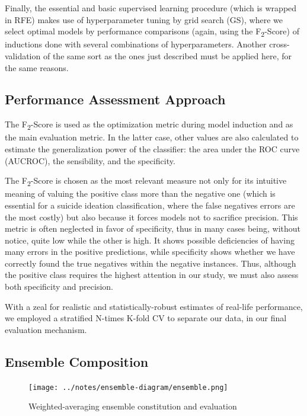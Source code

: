 Finally, the essential and basic supervised learning procedure (which is wrapped in RFE) makes use of hyperparameter tuning by grid search (GS), where we select optimal models by performance comparisons (again, using the F\textsubscript{2}-Score) of inductions done with several combinations of hyperparameters.
Another cross-validation of the same sort as the ones just described must be applied here, for the same reasons.

\subsection{Performance Assessment Approach}\label{subsec:performance-assessment-approach}

The F\textsubscript{2}-Score is used as the optimization metric during model induction and as the main evaluation metric.
In the latter case, other values are also calculated to estimate the generalization power of the classifier: the area under the ROC curve (AUCROC), the sensibility, and the specificity.

The F\textsubscript{2}-Score is chosen as the most relevant measure not only for its intuitive meaning of valuing the positive class more than the negative one (which is essential for a suicide ideation classification, where the false negatives errors are the most costly) but also because it forces models not to sacrifice precision.
This metric is often neglected in favor of specificity, thus in many cases being, without notice, quite low while the other is high.
It shows possible deficiencies of having many errors in the positive predictions, while specificity shows whether we have correctly found the true negatives within the negative instances.
Thus, although the positive class requires the highest attention in our study, we must also assess both specificity and precision.

With a zeal for realistic and statistically-robust estimates of real-life performance, we employed a stratified N-times K-fold CV to separate our data, in our final evaluation mechanism.

\subsection{Ensemble Composition}\label{subsec:ensemble-composition}

\begin{figure}[h]
    \caption{Weighted-averaging ensemble constitution and evaluation}
    \centerline{\texttt{[image: ../notes/ensemble-diagram/ensemble.png]}}
    \label{fig:ensemble}
\end{figure}

